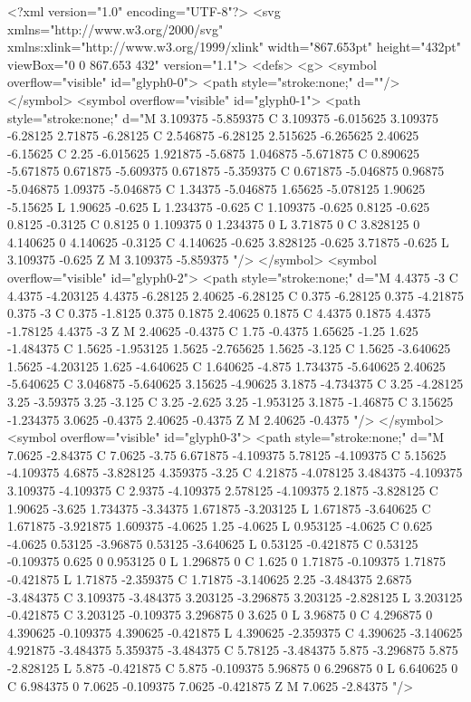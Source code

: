 <?xml version="1.0" encoding="UTF-8"?>
<svg xmlns="http://www.w3.org/2000/svg" xmlns:xlink="http://www.w3.org/1999/xlink" width="867.653pt" height="432pt" viewBox="0 0 867.653 432" version="1.1">
<defs>
<g>
<symbol overflow="visible" id="glyph0-0">
<path style="stroke:none;" d=""/>
</symbol>
<symbol overflow="visible" id="glyph0-1">
<path style="stroke:none;" d="M 3.109375 -5.859375 C 3.109375 -6.015625 3.109375 -6.28125 2.71875 -6.28125 C 2.546875 -6.28125 2.515625 -6.265625 2.40625 -6.15625 C 2.25 -6.015625 1.921875 -5.6875 1.046875 -5.671875 C 0.890625 -5.671875 0.671875 -5.609375 0.671875 -5.359375 C 0.671875 -5.046875 0.96875 -5.046875 1.09375 -5.046875 C 1.34375 -5.046875 1.65625 -5.078125 1.90625 -5.15625 L 1.90625 -0.625 L 1.234375 -0.625 C 1.109375 -0.625 0.8125 -0.625 0.8125 -0.3125 C 0.8125 0 1.109375 0 1.234375 0 L 3.71875 0 C 3.828125 0 4.140625 0 4.140625 -0.3125 C 4.140625 -0.625 3.828125 -0.625 3.71875 -0.625 L 3.109375 -0.625 Z M 3.109375 -5.859375 "/>
</symbol>
<symbol overflow="visible" id="glyph0-2">
<path style="stroke:none;" d="M 4.4375 -3 C 4.4375 -4.203125 4.4375 -6.28125 2.40625 -6.28125 C 0.375 -6.28125 0.375 -4.21875 0.375 -3 C 0.375 -1.8125 0.375 0.1875 2.40625 0.1875 C 4.4375 0.1875 4.4375 -1.78125 4.4375 -3 Z M 2.40625 -0.4375 C 1.75 -0.4375 1.65625 -1.25 1.625 -1.484375 C 1.5625 -1.953125 1.5625 -2.765625 1.5625 -3.125 C 1.5625 -3.640625 1.5625 -4.203125 1.625 -4.640625 C 1.640625 -4.875 1.734375 -5.640625 2.40625 -5.640625 C 3.046875 -5.640625 3.15625 -4.90625 3.1875 -4.734375 C 3.25 -4.28125 3.25 -3.59375 3.25 -3.125 C 3.25 -2.625 3.25 -1.953125 3.1875 -1.46875 C 3.15625 -1.234375 3.0625 -0.4375 2.40625 -0.4375 Z M 2.40625 -0.4375 "/>
</symbol>
<symbol overflow="visible" id="glyph0-3">
<path style="stroke:none;" d="M 7.0625 -2.84375 C 7.0625 -3.75 6.671875 -4.109375 5.78125 -4.109375 C 5.15625 -4.109375 4.6875 -3.828125 4.359375 -3.25 C 4.21875 -4.078125 3.484375 -4.109375 3.109375 -4.109375 C 2.9375 -4.109375 2.578125 -4.109375 2.1875 -3.828125 C 1.90625 -3.625 1.734375 -3.34375 1.671875 -3.203125 L 1.671875 -3.640625 C 1.671875 -3.921875 1.609375 -4.0625 1.25 -4.0625 L 0.953125 -4.0625 C 0.625 -4.0625 0.53125 -3.96875 0.53125 -3.640625 L 0.53125 -0.421875 C 0.53125 -0.109375 0.625 0 0.953125 0 L 1.296875 0 C 1.625 0 1.71875 -0.109375 1.71875 -0.421875 L 1.71875 -2.359375 C 1.71875 -3.140625 2.25 -3.484375 2.6875 -3.484375 C 3.109375 -3.484375 3.203125 -3.296875 3.203125 -2.828125 L 3.203125 -0.421875 C 3.203125 -0.109375 3.296875 0 3.625 0 L 3.96875 0 C 4.296875 0 4.390625 -0.109375 4.390625 -0.421875 L 4.390625 -2.359375 C 4.390625 -3.140625 4.921875 -3.484375 5.359375 -3.484375 C 5.78125 -3.484375 5.875 -3.296875 5.875 -2.828125 L 5.875 -0.421875 C 5.875 -0.109375 5.96875 0 6.296875 0 L 6.640625 0 C 6.984375 0 7.0625 -0.109375 7.0625 -0.421875 Z M 7.0625 -2.84375 "/>
